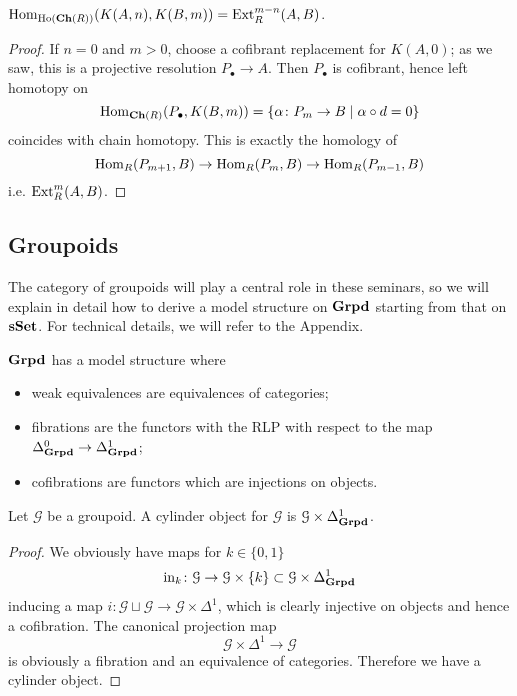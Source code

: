 \begin{refsection}
\begin{prop}
$\mathrm{Hom}_{\mathrm{Ho}(\mathbf{Ch}(R))}(K(A,n),K(B,m)) = \mathrm{Ext}_R^{m-n}(A,B)$.
\end{prop}

\begin{proof}
If $n = 0$ and $m > 0$, choose a cofibrant replacement for $K(A,0)$; as we saw, this is a projective resolution $P_\bullet \to A$. Then $P_\bullet$ is cofibrant, hence left homotopy on
\[
\mathrm{Hom}_{\mathbf{Ch}(R)}(P_\bullet, K(B,m)) = \{\alpha \colon P_m \to B \mid \alpha \circ d = 0 \}
\]
coincides with chain homotopy. This is exactly the homology of
\[
\mathrm{Hom}_R(P_{m+1},B) \to \mathrm{Hom}_R(P_m,B) \to \mathrm{Hom}_R(P_{m-1},B)
\]
i.e. $\mathrm{Ext}^m_R(A,B)$.
\end{proof}

\subsection{Groupoids} \label{model structure on groupoids}

The category of groupoids will play a central role in these seminars, so we will explain in detail how to derive a model structure on $\mathbf{Grpd}$ starting from that on $\mathbf{sSet}$. For technical details, we will refer to the Appendix.

\begin{thm} \label{thm model structure on groupoids}
$\mathbf{Grpd}$ has a model structure where
\begin{itemize}
\item weak equivalences are equivalences of categories;
\item fibrations are the functors with the RLP with respect to the map $\Delta^0_{\mathbf{Grpd}} \to \Delta^1_{\mathbf{Grpd}}$;
\item cofibrations are functors which are injections on objects.
\end{itemize}
\end{thm} %

\begin{prop} \label{prop cylinder for groupoids}
Let $\mathcal G$ be a groupoid. A cylinder object for $\mathcal G$ is $\mathcal G \times \Delta^1_{\mathbf{Grpd}}$.
\end{prop}

\begin{proof}
We obviously have maps for $k \in \{0,1\}$
\[
\mathrm{in}_k \colon \mathcal G \to \mathcal G \times \{k\} \subset \mathcal G \times \Delta^1_{\mathbf{Grpd}}
\]
inducing a map $i \colon \mathcal G \sqcup \mathcal G \to \mathcal G \times \Delta^1$, which is clearly injective on objects and hence a cofibration. The canonical projection map
\[
\mathcal G \times \Delta^1 \to \mathcal G
\]
is obviously a fibration and an equivalence of categories. Therefore we have a cylinder object.
\end{proof}


\end{refsection}
